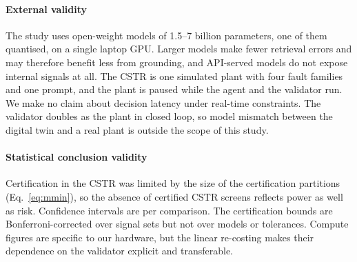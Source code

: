 \paragraph{External validity} The study uses open-weight models of 1.5--7 billion parameters, one of them
quantised, on a single laptop GPU. Larger models make fewer retrieval errors and may therefore benefit less from
grounding, and API-served models do not expose internal signals at all. The CSTR is one simulated plant with four
fault families and one prompt, and the plant is paused while the agent and the validator run. We make no claim
about decision latency under real-time constraints. The validator doubles as the plant in closed loop, so model
mismatch between the digital twin and a real plant is outside the scope of this study.

\paragraph{Statistical conclusion validity} Certification in the CSTR was limited by the size of the
certification partitions (Eq.~\ref{eq:mmin}), so the absence of certified CSTR screens reflects power as well as
risk. Confidence intervals are per comparison. The certification bounds are Bonferroni-corrected over signal sets
but not over models or tolerances. Compute figures are specific to our hardware, but the linear re-costing makes
their dependence on the validator explicit and transferable.
